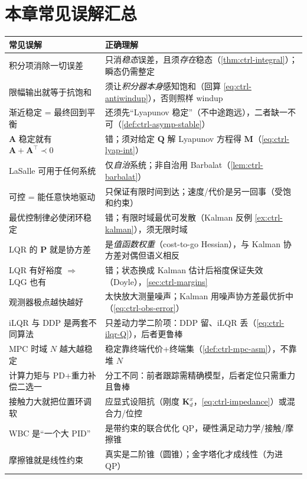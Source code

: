\section*{本章常见误解汇总}
\begin{table}[H]\centering\small
\begin{tabular}{p{} p{}}
\toprule
\textbf{常见误解} & \textbf{正确理解} \\
\midrule
积分项消除一切误差 & 只消\emph{稳态}误差，且须\emph{存在}稳态（\cref{thm:ctrl-integral}）；瞬态仍需整定 \\
限幅输出就等于抗饱和 & 须让\emph{积分器本身}感知饱和（回算 \cref{eq:ctrl-antiwindup}），否则照样 windup \\
渐近稳定 = 最终回到平衡 & 还须先“Lyapunov 稳定”（不中途跑远），二者缺一不可（\cref{def:ctrl-asymp-stable}） \\
$\mathbf{A}$ 稳定就有 $\mathbf{A}+\mathbf{A}^\top\prec0$ & 错；须对给定 $\mathbf{Q}$ 解 Lyapunov 方程得 $\mathbf{M}$（\cref{eq:ctrl-lyap-int}） \\
LaSalle 可用于任何系统 & 仅\emph{自治}系统；非自治用 Barbalat（\cref{lem:ctrl-barbalat}） \\
可控 = 能任意快地驱动 & 只保证有限时间到达；速度/代价是另一回事（受饱和约束） \\
最优控制律必使闭环稳定 & 错；有限时域最优可发散（Kalman 反例 \cref{ex:ctrl-kalman}），须无限时域 \\
LQR 的 $\mathbf{P}$ 就是协方差 & 是\emph{值函数权重}（cost-to-go Hessian），与 Kalman 协方差对偶但语义相反 \\
LQR 有好裕度 $\Rightarrow$ LQG 也有 & 错；状态换成 Kalman 估计后裕度保证失效（Doyle），\cref{sec:ctrl-margins} \\
观测器极点越快越好 & 太快放大测量噪声；Kalman 用噪声协方差最优折中（\cref{eq:ctrl-obs-error}） \\
iLQR 与 DDP 是两套不同算法 & 只差动力学二阶项：DDP 留、iLQR 丢（\cref{eq:ctrl-ilqr-Q}），后者更鲁棒 \\
MPC 时域 $N$ 越大越稳定 & 稳定靠终端代价+终端集（\cref{def:ctrl-mpc-asm}），不靠堆 $N$ \\
计算力矩与 PD+重力补偿二选一 & 分工不同：前者跟踪需精确模型，后者定位只需重力且鲁棒 \\
接触力大就把位置环调软 & 应显式设阻抗（刚度 $\mathbf{K}_d^x$，\cref{eq:ctrl-impedance}）或混合力/位控 \\
WBC 是“一个大 PID” & 是带约束的联合优化 QP，硬性满足动力学/接触/摩擦锥 \\
摩擦锥就是线性约束 & 真实是二阶锥（圆锥）；金字塔化才成线性（为进 QP） \\
\bottomrule
\end{tabular}
\end{table}

